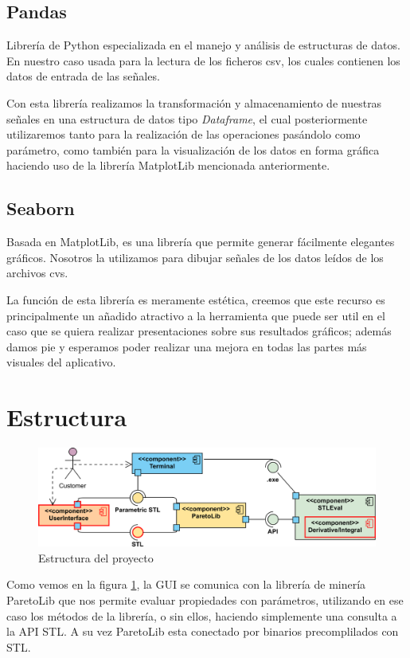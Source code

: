  
 
\subsection{Pandas}
Librería de Python especializada en el manejo y análisis de estructuras de datos. En nuestro caso usada para la lectura de los ficheros csv, los cuales contienen los datos de entrada de las señales.

Con esta librería realizamos la transformación y almacenamiento de nuestras señales en una estructura de datos tipo \textit{Dataframe}, el cual posteriormente utilizaremos tanto para la realización de las operaciones pasándolo como parámetro, como también para la visualización de los datos en forma gráfica haciendo uso de la librería MatplotLib mencionada anteriormente. 
 
 

\subsection{Seaborn} 
Basada en MatplotLib, es una librería que permite generar fácilmente elegantes gráficos. Nosotros la utilizamos para dibujar señales de los datos leídos de los archivos cvs.

La función de esta librería es meramente estética, creemos que este recurso es principalmente un añadido atractivo a la herramienta que puede ser util en el caso que se quiera realizar presentaciones sobre sus resultados gráficos; además damos pie y esperamos poder realizar una mejora en todas las partes más visuales del aplicativo. 
 
 

\section{Estructura}
\begin{figure}[htb]
\centering
  \includegraphics[width=.95\linewidth]{images/uml_diagram} 
\caption{Estructura del proyecto}
\label{fig:est}
\end{figure}
Como vemos en la figura \ref{fig:est}, la GUI se comunica con la librería de minería ParetoLib que nos permite evaluar propiedades con parámetros, utilizando en ese caso los métodos de la librería, o sin ellos, haciendo simplemente una consulta a la API STL. A su vez ParetoLib esta conectado por binarios precomplilados con STL.

